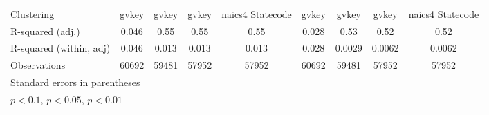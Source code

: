 {\begin{tabular}{l*{8}{c}}
\midrule
Clustering          &       gvkey         &       gvkey         &       gvkey         &naics4 Statecode         &       gvkey         &       gvkey         &       gvkey         &naics4 Statecode         \\
R-squared (adj.)    &       0.046         &        0.55         &        0.55         &        0.55         &       0.028         &        0.53         &        0.52         &        0.52         \\
R-squared (within, adj)&       0.046         &       0.013         &       0.013         &       0.013         &       0.028         &      0.0029         &      0.0062         &      0.0062         \\
Observations        &       60692         &       59481         &       57952         &       57952         &       60692         &       59481         &       57952         &       57952         \\
\bottomrule
\multicolumn{9}{l}{\footnotesize Standard errors in parentheses}\\
\multicolumn{9}{l}{\footnotesize \sym{*} \(p<0.1\), \sym{**} \(p<0.05\), \sym{***} \(p<0.01\)}\\
\end{tabular}
}
